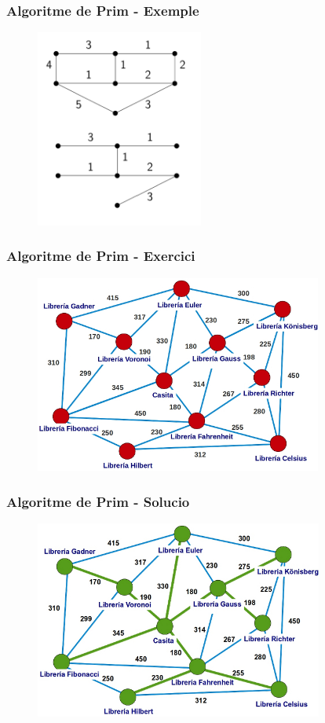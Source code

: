 \documentclass{beamer}
\begin{document}
\begin{frame}
\frametitle{Algoritme de Prim - Exemple}
\begin{figure}[h]
 \label{fig:volum}
\centering
\includegraphics[height=6.5cm]{prim7}
\end{figure}
\end{frame}

\begin{frame}
\frametitle{Algoritme de Prim - Exercici}
\begin{figure}[h]
 \label{fig:volum}
\centering
\includegraphics[height=6.5cm]{dijkstra_1}
\end{figure}
\end{frame}

\begin{frame}
\frametitle{Algoritme de Prim - Solucio}
\begin{figure}[h]
 \label{fig:volum}
\centering
\includegraphics[height=6.5cm]{dijkstra_2}
\end{figure}

\end{frame}
\end{document}
